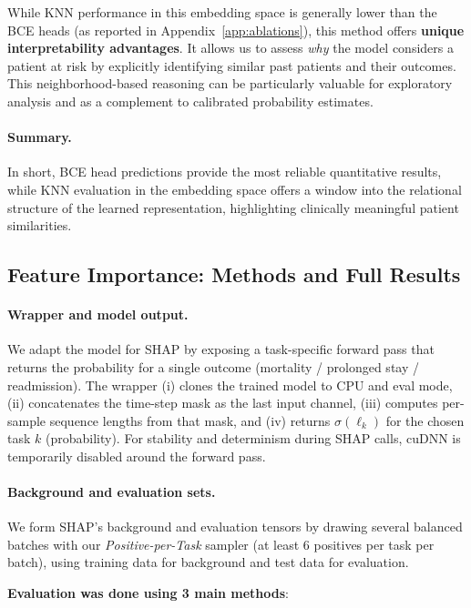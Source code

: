 \documentclass{article}
\theoremstyle{plain}
\theoremstyle{definition}
\theoremstyle{remark}
\begin{document}
While KNN performance in this embedding space is generally lower than the BCE heads (as reported in 
Appendix~\ref{app:ablations}), this method offers \textbf{unique interpretability advantages}. It allows us to 
assess \textit{why} the model considers a patient at risk by explicitly identifying similar past patients 
and their outcomes. This neighborhood-based reasoning can be particularly valuable for exploratory 
analysis and as a complement to calibrated probability estimates.  

\paragraph{Summary.}  
In short, BCE head predictions provide the most reliable quantitative results, while KNN evaluation 
in the embedding space offers a window into the relational structure of the learned representation, 
highlighting clinically meaningful patient similarities.

\subsection{Feature Importance: Methods and Full Results}

\paragraph{Wrapper and model output.}
We adapt the model for SHAP by exposing a task-specific forward pass that returns the probability 
for a single outcome (mortality / prolonged stay / readmission). The wrapper (i) clones the trained model to CPU 
and eval mode, (ii) concatenates the time-step mask as the last input channel, (iii) computes per-sample sequence 
lengths from that mask, and (iv) returns $\sigma(\ell_{k})$ for the chosen task $k$ (probability). 
For stability and determinism during SHAP calls, cuDNN is temporarily disabled around the forward pass.

\paragraph{Background and evaluation sets.}
We form SHAP’s background and evaluation tensors by drawing several balanced batches with our 
\emph{Positive-per-Task} sampler (at least 6 positives per task per batch), using training data for background and test data for evaluation.

\textbf{Evaluation was done using 3 main methods}:
\end{document}
